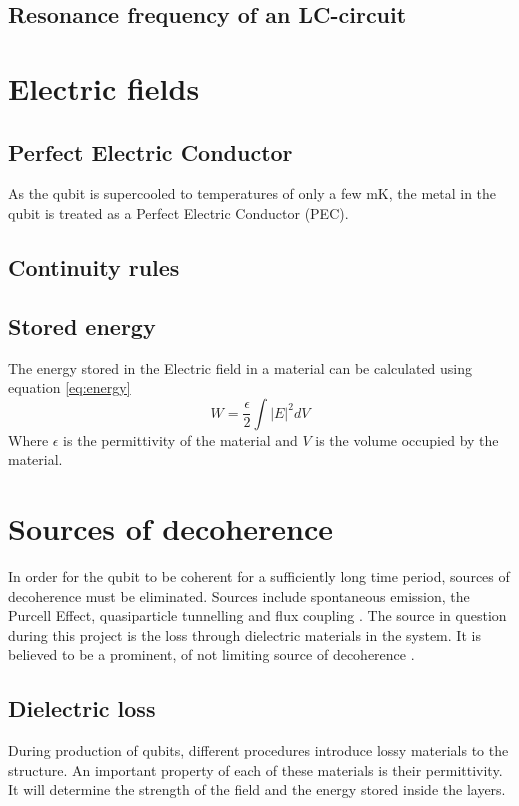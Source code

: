 \subsection{Resonance frequency of an LC-circuit}



\section{Electric fields}
\subsection{Perfect Electric Conductor}
As the qubit is supercooled to temperatures of only a few mK, the metal in the qubit is treated as a Perfect Electric Conductor (PEC).
\subsection{Continuity rules}
\subsection{Stored energy}
The energy stored in the Electric field in a material can be calculated using equation \eqref{eq:energy}
\begin{equation} \label{eq:energy}
	W = \frac{\epsilon}{2}\int{|E|}^{2}dV
\end{equation}
Where \(\epsilon\) is the permittivity of the material and \(V\) is the volume occupied by the material.

\section{Sources of decoherence}
In order for the qubit to be coherent for a sufficiently long time period, sources of decoherence must be eliminated. Sources include spontaneous emission, the Purcell Effect, quasiparticle tunnelling and flux coupling \cite{Koch2007}.   
 The source in question during this project is the loss through dielectric materials in the system. It is believed to be a prominent, of not limiting source of decoherence \cite{PhysRevLett.95.210503}\cite{Koch2007}. 
\subsection{Dielectric loss}
During production of qubits, different procedures introduce lossy materials to the structure. An important property of each of these materials is their permittivity. It will determine the strength of the field and the energy stored inside the layers.
